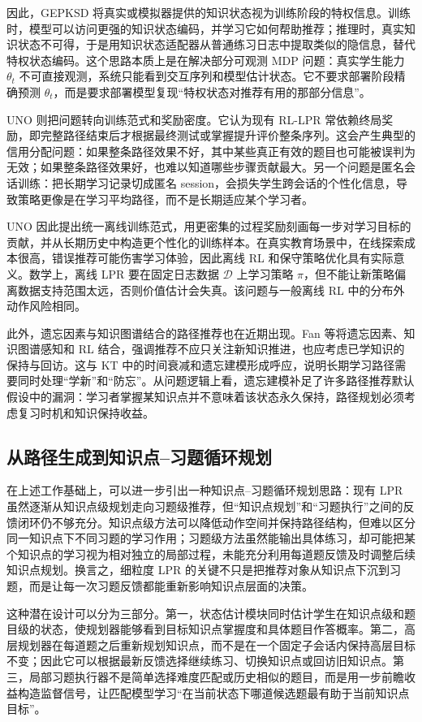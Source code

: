 \documentclass[UTF8,a4paper,zihao=-4]{ctexart}
\begin{document}
因此，GEPKSD 将真实或模拟器提供的知识状态视为训练阶段的特权信息。训练时，模型可以访问更强的知识状态编码，并学习它如何帮助推荐；推理时，真实知识状态不可得，于是用知识状态适配器从普通练习日志中提取类似的隐信息，替代特权状态编码。这个思路本质上是在解决部分可观测 MDP 问题：真实学生能力 $\theta_t$ 不可直接观测，系统只能看到交互序列和模型估计状态。它不要求部署阶段精确预测 $\theta_t$，而是要求部署模型复现“特权状态对推荐有用的那部分信息”。

UNO 则把问题转向训练范式和奖励密度。它认为现有 RL-LPR 常依赖终局奖励，即完整路径结束后才根据最终测试或掌握提升评价整条序列。这会产生典型的信用分配问题：如果整条路径效果不好，其中某些真正有效的题目也可能被误判为无效；如果整条路径效果好，也难以知道哪些步骤贡献最大。另一个问题是匿名会话训练：把长期学习记录切成匿名 session，会损失学生跨会话的个性化信息，导致策略更像是在学习平均路径，而不是长期适应某个学习者\cite{Peng2026UNO}。

UNO 因此提出统一离线训练范式，用更密集的过程奖励刻画每一步对学习目标的贡献，并从长期历史中构造更个性化的训练样本。在真实教育场景中，在线探索成本很高，错误推荐可能伤害学习体验，因此离线 RL 和保守策略优化具有实际意义。数学上，离线 LPR 要在固定日志数据 $\mathcal{D}$ 上学习策略 $\pi$，但不能让新策略偏离数据支持范围太远，否则价值估计会失真。该问题与一般离线 RL 中的分布外动作风险相同。

此外，遗忘因素与知识图谱结合的路径推荐也在近期出现。Fan 等将遗忘因素、知识图谱感知和 RL 结合，强调推荐不应只关注新知识推进，也应考虑已学知识的保持与回访\cite{Fan2025ForgettingKG}。这与 KT 中的时间衰减和遗忘建模形成呼应，说明长期学习路径需要同时处理“学新”和“防忘”。从问题逻辑上看，遗忘建模补足了许多路径推荐默认假设中的漏洞：学习者掌握某知识点并不意味着该状态永久保持，路径规划必须考虑复习时机和知识保持收益。

\subsection{从路径生成到知识点--习题循环规划}

在上述工作基础上，可以进一步引出一种知识点--习题循环规划思路：现有 LPR 虽然逐渐从知识点级规划走向习题级推荐，但“知识点规划”和“习题执行”之间的反馈闭环仍不够充分。知识点级方法可以降低动作空间并保持路径结构，但难以区分同一知识点下不同习题的学习作用；习题级方法虽然能输出具体练习，却可能把某个知识点的学习视为相对独立的局部过程，未能充分利用每道题反馈及时调整后续知识点规划。换言之，细粒度 LPR 的关键不只是把推荐对象从知识点下沉到习题，而是让每一次习题反馈都能重新影响知识点层面的决策。

这种潜在设计可以分为三部分。第一，状态估计模块同时估计学生在知识点级和题目级的状态，使规划器能够看到目标知识点掌握度和具体题目作答概率。第二，高层规划器在每道题之后重新规划知识点，而不是在一个固定子会话内保持高层目标不变；因此它可以根据最新反馈选择继续练习、切换知识点或回访旧知识点。第三，局部习题执行器不是简单选择难度匹配或历史相似的题目，而是用一步前瞻收益构造监督信号，让匹配模型学习“在当前状态下哪道候选题最有助于当前知识点目标”。
\end{document}
